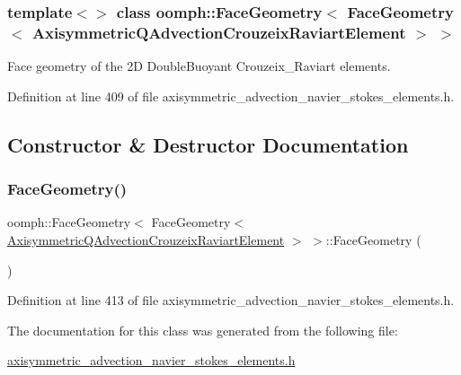 \subsubsection*{template$<$$>$\newline
class oomph\+::\+Face\+Geometry$<$ Face\+Geometry$<$ Axisymmetric\+Q\+Advection\+Crouzeix\+Raviart\+Element $>$ $>$}

Face geometry of the 2D Double\+Buoyant Crouzeix\+\_\+\+Raviart elements. 

Definition at line 409 of file axisymmetric\+\_\+advection\+\_\+navier\+\_\+stokes\+\_\+elements.\+h.



\subsection{Constructor \& Destructor Documentation}
\mbox{\label{classoomph_1_1FaceGeometry_3_01FaceGeometry_3_01AxisymmetricQAdvectionCrouzeixRaviartElement_01_4_01_4_a89552e00c39d62915ce157f8aaa8c0be}} 
\subsubsection{\texorpdfstring{Face\+Geometry()}{FaceGeometry()}}
{\footnotesize\ttfamily oomph\+::\+Face\+Geometry$<$ Face\+Geometry$<$ \hyperlink{classoomph_1_1AxisymmetricQAdvectionCrouzeixRaviartElement}{Axisymmetric\+Q\+Advection\+Crouzeix\+Raviart\+Element} $>$ $>$\+::Face\+Geometry (\begin{DoxyParamCaption}{ }\end{DoxyParamCaption})\hspace{0.3cm}{\ttfamily [inline]}}



Definition at line 413 of file axisymmetric\+\_\+advection\+\_\+navier\+\_\+stokes\+\_\+elements.\+h.



The documentation for this class was generated from the following file\+:\begin{DoxyCompactItemize}
\item 
\hyperlink{axisymmetric__advection__navier__stokes__elements_8h}{axisymmetric\+\_\+advection\+\_\+navier\+\_\+stokes\+\_\+elements.\+h}\end{DoxyCompactItemize}
